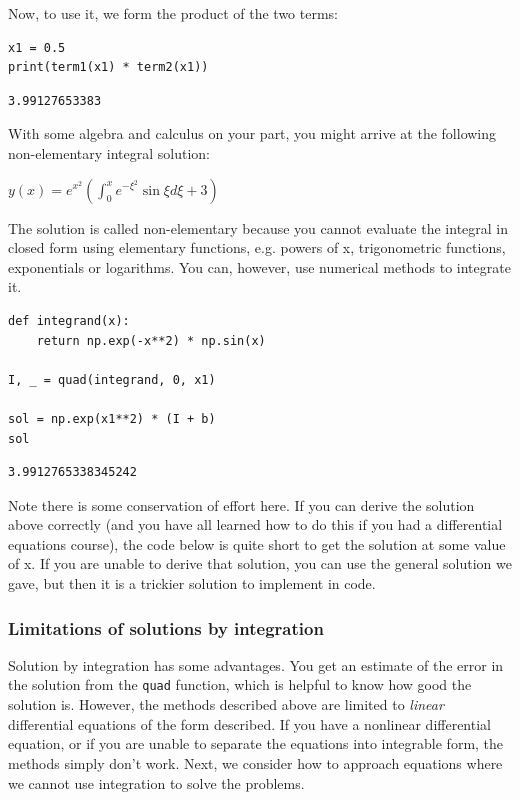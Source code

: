 \documentclass[11pt]{article}
\begin{document}
Now, to use it, we form the product of the two terms:

\begin{verbatim}
x1 = 0.5
print(term1(x1) * term2(x1))
\end{verbatim}

\begin{verbatim}
3.99127653383

\end{verbatim}

With some algebra and calculus on your part, you might arrive at the following non-elementary integral solution:

\(y(x) = e^{x^2} \left(\int_0^x e^{-\xi^2} \sin{\xi} d\xi + 3\right)\)

The solution is called non-elementary because you cannot evaluate the integral in closed form using elementary functions, e.g. powers of x, trigonometric functions, exponentials or logarithms. You can, however, use numerical methods to integrate it.

\begin{verbatim}
def integrand(x):
    return np.exp(-x**2) * np.sin(x)

I, _ = quad(integrand, 0, x1)

sol = np.exp(x1**2) * (I + b)
sol
\end{verbatim}

\begin{verbatim}
3.9912765338345242
\end{verbatim}

Note there is some conservation of effort here. If you can derive the solution above correctly (and you have all learned how to do this if you had a differential equations course), the code below is quite short to get the solution at some value of x. If you are unable to derive that solution, you can use the general solution we gave, but then it is a trickier solution to implement in code.

\subsubsection{Limitations of solutions by integration}
\label{sec:orgc9ed77d}

Solution by integration has some advantages. You get an estimate of the error in the solution from the \texttt{quad} function, which is helpful to know how good the solution is. However, the methods described above are limited to \emph{linear} differential equations of the form described. If you have a nonlinear differential equation, or if you are unable to separate the equations into integrable form, the methods simply don't work. Next, we consider how to approach equations where we cannot use integration to solve the problems.
\end{document}
